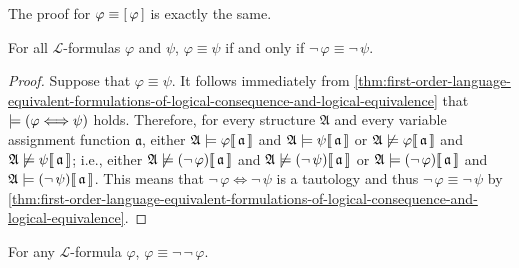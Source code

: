 \begin{rem}
    The proof for \( \varphi \equiv \mleft[ \,\varphi\, \mright] \) is exactly the same.
\end{rem}

\begin{thm}[Negation]
     \label{logical-equivalence:two-formulas-are-logically-equivalent-iff-their-negations-are-logically-equivalent}
    For all \( \mathcal{L} \)-formulas \( \varphi \) and \( \psi \), \( \varphi \equiv \psi \) if and only if \( \lnot \, \varphi \equiv \lnot \, \psi \).
\end{thm}

\begin{proof}
    Suppose that \( \varphi \equiv \psi \). It follows immediately from \cref{thm:first-order-language-equivalent-formulations-of-logical-consequence-and-logical-equivalence}
    that \( \models \mleft( \varphi {\iff} \psi \mright) \) holds.
    Therefore, for every structure \( \mathfrak{A} \) and every variable assignment function \( \mathfrak{a} \),
    either \(  \mathfrak{A} \models \varphi\llbracket\, \mathfrak{a} \,\rrbracket \) and \(  \mathfrak{A} \models \psi\llbracket\, \mathfrak{a} \,\rrbracket \)
    or \(  \mathfrak{A} \not\models \varphi\llbracket\,\mathfrak{a} \,\rrbracket \) and \(  \mathfrak{A} \not\models \psi\llbracket\,\mathfrak{a} \,\rrbracket \);
    i.e., either \( \folwffnonsatisfaction{\mathfrak{A}}{\mleft( \lnot \, \varphi \mright)}{\mathfrak{a}} \)
    and \( \folwffnonsatisfaction{\mathfrak{A}}{\mleft( \lnot \, \psi \mright)}{\mathfrak{a}} \) or
    \( \folwffsatisfaction{\mathfrak{A}}{\mleft( \lnot \, \varphi \mright)}{\mathfrak{a}} \)
    and \( \folwffsatisfaction{\mathfrak{A}}{\mleft(\lnot \, \psi \mright)}{\mathfrak{a}} \).
    This means that \( \lnot \, \varphi {\iff} \lnot \, \psi \) is a tautology and thus \( \lnot \, \varphi \equiv \lnot \, \psi \)
    by \cref{thm:first-order-language-equivalent-formulations-of-logical-consequence-and-logical-equivalence}.
\end{proof}

\begin{thm}
     \label{logical-equivalence:every-formula-is-equivalent-to-its-double-negated-form}
    For any \( \mathcal{L} \)-formula \( \varphi \), \( \varphi \equiv \lnot \, \lnot \, \varphi \).
\end{thm}

